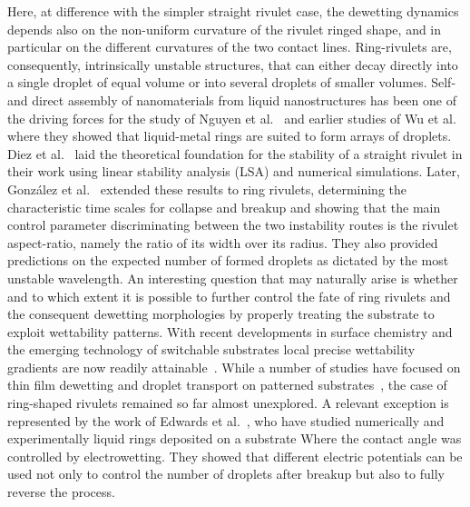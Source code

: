 \documentclass[%
 aip,
 amsmath,amssymb,
 reprint,%
]{revtex4-1}
\begin{document}
Here, at difference with the simpler straight rivulet case, the dewetting dynamics depends also on the non-uniform curvature of the rivulet ringed shape, and in particular on the different curvatures of the two contact lines.
Ring-rivulets are, consequently, intrinsically unstable structures, that can either decay directly into a single droplet of equal volume or into several droplets of smaller volumes.
Self- and direct assembly of nanomaterials from liquid nanostructures has been one of the driving forces for the study of Nguyen et al.~\cite{nguyenCompetitionCollapseBreakup2012} and earlier studies of Wu et al.~\cite{wuBreakupPatternedNanoscale2010} where they showed that liquid-metal rings are suited to form arrays of droplets.
Diez et al.~\cite{diezBreakupFluidRivulets2009, diezStabilityFinitelengthRivulet2009} laid the theoretical foundation for the stability of a straight rivulet in their work using linear stability analysis (LSA) and numerical simulations. 
Later, Gonz{\'a}lez et al.~\cite{gonzalezStabilityLiquidRing2013} extended these results to ring rivulets, determining the characteristic time scales for collapse and breakup and showing that the main control parameter discriminating between the two instability routes is the rivulet aspect-ratio, namely the ratio of its width over its radius.
They also provided predictions on the expected number of formed droplets as dictated by the most unstable wavelength.
An interesting question that may naturally arise is whether and to which extent it is possible to further control the fate of ring rivulets and the consequent dewetting morphologies by properly treating the substrate to exploit wettability patterns. 
With recent developments in surface chemistry and the emerging technology of switchable substrates local precise wettability gradients are now readily attainable~\cite{xinReversiblySwitchableWettability2010, stuartEmergingApplicationsStimuliresponsive2010,chenThermalresponsiveHydrogelSurface2010, ichimuraLightDrivenMotionLiquids2000, mugeleElectrowettingConvenientWay2005, edwardsControllingBreakupToroidal2021}.
While a number of studies have focused on thin film dewetting and droplet transport on patterned substrates~\cite{liuActuatingWaterDroplets2015,Savva_Groves_Kalliadasis_2019, zitzControllingDewettingMorphologies2023}, the case of ring-shaped rivulets remained so far almost unexplored.
A relevant exception is represented by the work of Edwards et al.~\cite{edwardsControllingBreakupToroidal2021}, who have studied numerically and experimentally liquid rings deposited on a substrate Where the contact angle was controlled by electrowetting. 
They showed that different electric potentials can be used not only to control the number of droplets after breakup but also to fully reverse the process.
\end{document}
